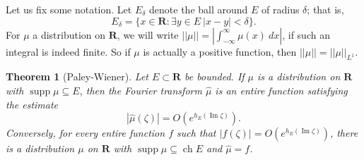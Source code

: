 \documentclass[12pt]{report}
\newcommand{\RR}{\mathbf{R}}
\DeclareMathOperator{\ch}{ch}
\DeclareMathOperator{\supp}{supp}
\renewcommand{\Im}{\operatorname{Im}}
\newtheorem{theorem}{Theorem}[chapter]
\theoremstyle{definition}
\theoremstyle{remark}
\begin{document}
    Let us fix some notation. Let $E_\delta$ denote the ball around $E$ of radius $\delta$; that is,
$$E_\delta = \{x \in \RR: \exists y \in E~|x - y| < \delta\}.$$
    For $\mu$ a distribution on $\RR$, we will write $||\mu|| = |\int_{-\infty}^\infty \mu(x) ~dx|$, if such an integral is indeed finite. So if $\mu$ is actually a positive function, then $||\mu|| = ||\mu||_{L^1}$.
\begin{theorem}[Paley-Wiener]
    Let $E \subset \RR$ be bounded. If $\mu$ is a distribution on $\RR$ with $\supp \mu \subseteq E$, then the Fourier transform $\hat \mu$ is an entire function satisfying the estimate
$$|\hat \mu(\zeta)| = O(e^{h_E(\Im \zeta)}).$$
    Conversely, for every entire function $f$ such that $|f(\zeta)| = O(e^{h_E(\Im \zeta)})$, there is a distribution $\mu$ on $\RR$ with $\supp \mu \subseteq \ch E$ and $\hat \mu = f$.
\end{theorem}
\end{document}

